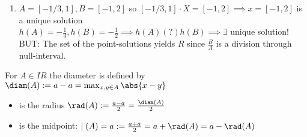 \begin{itemize}
\begin{*example}
\begin{enumerate}
\begin{align*}
				\end{align*}
				 $\square$ In general, it holds: the set of all point-solutions $X_{\text{set}}=\frac{B}{A}\supseteq X_{general}$ (algebraic solutions)
				 If $AX=B $ with $0\not \in A$ has the algebraic solution $X\in IR$, then $X_{general}\subseteq B/A$, since $\forall x\in X_{general}$ it holds $\forall a\in A: a\cdot x=b \in B$, while $X_{set}=B/A:=\{x=b/a| b\in B, a\in A\}$.
				\item $A=[-1/3,1], B=[-1,2]$ so $[-1/3,1]\cdot X=[-1,2] \implies x=[-1,2]$ is a unique solution\\
				$h(A)=-\frac{1}{3}, h(B)=-\frac{1}{2} \implies h(A)(?)h(B) \implies \exists$ unique solution! 
				 BUT:
				 The set of the point-solutions yields $R$ since $\frac{B}{A}$ is a division through null-interval. 
			\end{enumerate}
		
	\end{*example}
\end{itemize} 

\begin{*definition}
	For $A\in IR$ the diameter is defined by $\diam(A):=a-a= \max_{x,y\in A}\abs{x-y}$ 
	\begin{itemize}
		\item is the radius $\rad(A):=\frac{a-a}{2}=\frac{\diam(A)}{2}$
		\item is the midpoint: $\mid(A)=a:=\frac{a+a}{2}=a+\rad(A)=a-\rad(A)$
	\end{itemize}
\end{*definition}
%
